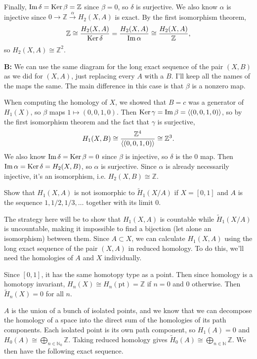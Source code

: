 \documentclass[twoside,10pt]{article}
\begin{document}
\begin{enumerate}
		Finally, $\operatorname{Im} \delta = \operatorname{Ker} \beta = \mathbb{Z}$ since $\beta=0$, so $\delta$ is surjective. We also know $\alpha$ is injective since $0\to \mathbb{Z} \stackrel{\alpha }{\to } H_2(X,A)$ is exact. By the first isomorphism theorem,
		\[
			\mathbb{Z} \cong \frac{H_2(X,A)}{\operatorname{Ker} \delta} = \frac{H_2(X,A)}{\operatorname{Im} \alpha} \cong \frac{H_2(X,A)}{\mathbb{Z}},
		\] so $H_2(X,A) \cong \mathbb{Z}^2$.

		\textbf{B:} We can use the same diagram for the long exact sequence of the pair $(X,B)$ as we did for $(X,A)$, just replacing every $A$ with a $B$. I'll keep all the names of the maps the same. The main difference in this case is that $\beta$ is a nonzero map.

		When computing the homology of $X$, we showed that $B=c$ was a generator of $H_1(X)$, so $\beta$ maps $1 \mapsto (0,0,1,0)$. Then $\operatorname{Ker} \gamma=\operatorname{Im} \beta=\langle (0,0,1,0) \rangle$, so by the first isomorphism theorem and the fact that $\gamma$ is surjective,
		\[
			H_1(X,B) \cong \frac{\mathbb{Z}^{4}}{\langle (0,0,1,0) \rangle} \cong \mathbb{Z}^{3}.
		\] 
		We also know $\operatorname{Im} \delta=\operatorname{Ker} \beta=0$ since $\beta$ is injective, so $\delta$ is the 0 map. Then $\operatorname{Im} \alpha=\operatorname{Ker}  \delta=H_2(X,B)$, so $\alpha$ is surjective. Since $\alpha$ is already necessarily injective, it's an isomorphism, i.e. $H_2(X,B) \cong \mathbb{Z}$.
\end{enumerate}

\newpage

\begin{exer}[2.1: 26]
	Show that $H_1(X,A)$ is not isomorphic to $\tilde{H}_1(X/A)$ if $X=[0,1]$ and $A$ is the sequence $1, 1/2, 1/3, \dots$ together with its limit 0.
\end{exer}

The strategy here will be to show that $H_1(X,A)$ is countable while $\tilde{H}_1(X/A)$ is uncountable, making it impossible to find a bijection (let alone an isomorphism) between them. Since $A \subset X$, we can calculate $H_1(X,A)$ using the long exact sequence of the pair $(X,A)$ in reduced homology. To do this, we'll need the homologies of $A$ and $X$ individually.

Since $[0,1]$, it has the same homotopy type as a point. Then since homology is a homotopy invariant, $H_{n}(X) \cong H_{n}(\text{pt}) = \mathbb{Z}$ if $n=0$ and 0 otherwise. Then $\tilde{H}_{n}(X) = 0$ for all $n$.

$A$ is the union of a bunch of isolated points, and we know that we can decompose the homology of a space into the direct sum of the homologies of its path components. Each isolated point is its own path component, so $H_1(A) = 0$ and $H_0(A) \cong \bigoplus_{n \in \mathbb{N}_{0}} \mathbb{Z}$. Taking reduced homology gives $\tilde{H}_0(A) \cong \bigoplus_{n \in \mathbb{N}}\mathbb{Z}$. We then have the following exact sequence.
\end{document}
